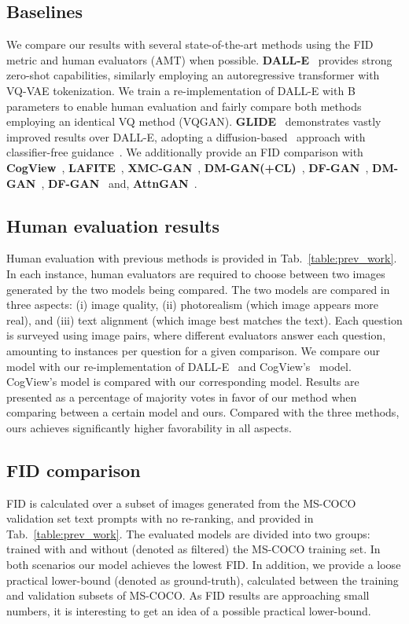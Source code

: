 \documentclass[final]{cvpr}
\begin{document}
\subsection{Baselines} We compare our results with several state-of-the-art methods using the FID metric and human evaluators (AMT) when possible. \textbf{DALL-E}~\cite{ramesh2021zero} provides strong zero-shot capabilities, similarly employing an autoregressive transformer with VQ-VAE tokenization. We train a re-implementation of DALL-E with B parameters to enable human evaluation and fairly compare both methods employing an identical VQ method (VQGAN). \textbf{GLIDE}~\cite{nichol2021glide} demonstrates vastly improved results over DALL-E, adopting a diffusion-based~\cite{sohl2015deep} approach with classifier-free guidance~\cite{ho2021classifier}. We additionally provide an FID comparison with \textbf{CogView}~\cite{ding2021cogview}, \textbf{LAFITE}~\cite{zhou2021lafite}, \textbf{XMC-GAN}~\cite{zhang2021cross}, \textbf{DM-GAN(+CL)}~\cite{ye2021improving}, \textbf{DF-GAN}~\cite{tao2020df}, \textbf{DM-GAN}~\cite{zhu2019dm}, \textbf{DF-GAN}~\cite{tao2020df} and, \textbf{AttnGAN}~\cite{xu2018attngan}.

\subsection{Human evaluation results} Human evaluation with previous methods is provided in Tab.~\ref{table:prev_work}. In each instance, human evaluators are required to choose between two images generated by the two models being compared. The two models are compared in three aspects: (i) image quality, (ii) photorealism (which image appears more real), and (iii) text alignment (which image best matches the text). Each question is surveyed using  image pairs, where  different evaluators answer each question, amounting to  instances per question for a given comparison.
We compare our  model with our re-implementation of DALL-E~\cite{ramesh2021zero} and CogView's~\cite{ding2021cogview}  model. CogView's  model is compared with our corresponding model. Results are presented as a percentage of majority votes in favor of our method when comparing between a certain model and ours. Compared with the three methods, ours achieves significantly higher favorability in all aspects.

\subsection{FID comparison} FID is calculated over a subset of  images generated from the MS-COCO validation set text prompts with no re-ranking, and provided in Tab.~\ref{table:prev_work}. The evaluated models are divided into two groups: trained with and without (denoted as filtered) the MS-COCO training set. In both scenarios our model achieves the lowest FID. In addition, we provide a loose practical lower-bound (denoted as ground-truth), calculated between the training and validation
subsets of MS-COCO. As FID results are approaching small numbers, it is interesting to get an idea of a possible practical lower-bound.
\end{document}
